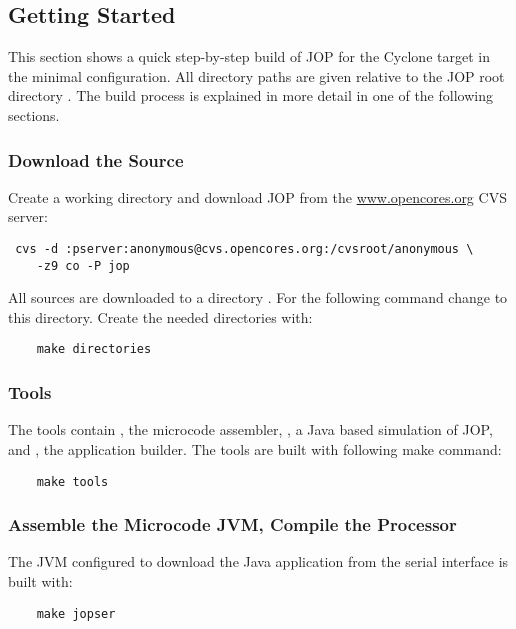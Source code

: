 \subsection{Getting Started}

\label{sec:started}

This section shows a quick step-by-step build of JOP for the Cyclone
target in the minimal configuration. All directory paths are given
relative to the JOP root directory . The build process is
explained in more detail in one of the following sections.

\subsubsection{Download the Source}

Create a working directory and download JOP from the
\url{www.opencores.org} CVS server:

\begin{verbatim}
 cvs -d :pserver:anonymous@cvs.opencores.org:/cvsroot/anonymous \
    -z9 co -P jop
\end{verbatim}

All sources are downloaded to a directory . For the
following command change to this directory. Create the needed
directories with:
\begin{verbatim}
    make directories
\end{verbatim}

\subsubsection{Tools}

The tools contain , the microcode assembler, ,
a Java based simulation of JOP, and \cmd{JOPizer}, the application
builder. The tools are built with following make command:

\begin{verbatim}
    make tools
\end{verbatim}

\subsubsection{Assemble the Microcode JVM, Compile the Processor}

The JVM configured to download the Java application from the serial
interface is built with:

\begin{verbatim}
    make jopser
\end{verbatim}

